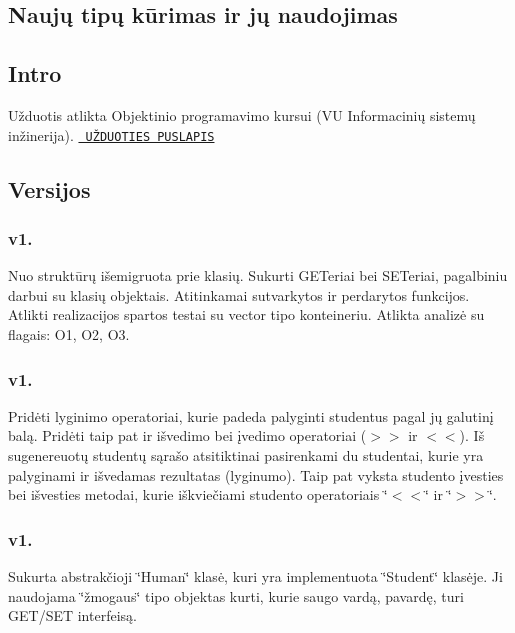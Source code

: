 \subsection*{Naujų tipų kūrimas ir jų naudojimas}

\subsection*{Intro}

Užduotis atlikta Objektinio programavimo kursui (VU Informacinių sistemų inžinerija). \href{https://github.com/objprog/paskaitos2019/wiki/3-oji-u%C5%BEduotis}{\texttt{ UŽ\+D\+U\+O\+T\+I\+ES P\+U\+S\+L\+A\+P\+IS}}

\subsection*{Versijos}

\subsubsection*{v1.}

Nuo struktūrų išemigruota prie klasių. Sukurti G\+ET\textquotesingle{}eriai bei S\+ET\textquotesingle{}eriai, pagalbiniu darbui su klasių objektais. Atitinkamai sutvarkytos ir perdarytos funkcijos. Atlikti realizacijos spartos testai su vector tipo konteineriu. Atlikta analizė su flag\textquotesingle{}ais\+: O1, O2, O3.

\subsubsection*{v1.}

Pridėti lyginimo operatoriai, kurie padeda palyginti studentus pagal jų galutinį balą. Pridėti taip pat ir išvedimo bei įvedimo operatoriai ($>$$>$ ir $<$$<$). Iš sugenereuotų studentų sąrašo atsitiktinai pasirenkami du studentai, kurie yra palyginami ir išvedamas rezultatas (lyginumo). Taip pat vyksta studento įvesties bei išvesties metodai, kurie iškviečiami studento operatoriais \char`\"{}$<$$<$\char`\"{} ir \char`\"{}$>$$>$\char`\"{}.

\subsubsection*{v1.}

Sukurta abstrakčioji \char`\"{}\+Human\char`\"{} klasė, kuri yra implementuota \char`\"{}\+Student\char`\"{} klasėje. Ji naudojama \char`\"{}žmogaus\char`\"{} tipo objektas kurti, kurie saugo vardą, pavardę, turi G\+E\+T/\+S\+ET interfeisą.

